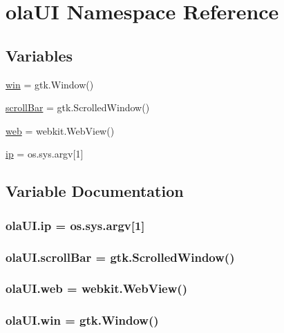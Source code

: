 \hypertarget{namespaceolaUI}{}\section{ola\+UI Namespace Reference}
\label{namespaceolaUI}
\subsection*{Variables}
\begin{DoxyCompactItemize}
\item 
\hyperlink{namespaceolaUI_a99a88a88414bc1bab55b329bd312ad76}{win} = gtk.\+Window()
\item 
\hyperlink{namespaceolaUI_a990ab1d4c8f6bdc16cffd8acb4f6be7b}{scroll\+Bar} = gtk.\+Scrolled\+Window()
\item 
\hyperlink{namespaceolaUI_a02fb6fdc4a5a894303b2c44d70971cc1}{web} = webkit.\+Web\+View()
\item 
\hyperlink{namespaceolaUI_a441ccce886b3119d7aec1d24ec8f25f7}{ip} = os.\+sys.\+argv\mbox{[}1\mbox{]}
\end{DoxyCompactItemize}


\subsection{Variable Documentation}
\subsubsection[{\texorpdfstring{ip}{ip}}]{\setlength{\rightskip}{0pt plus 5cm}ola\+U\+I.\+ip = os.\+sys.\+argv\mbox{[}1\mbox{]}}\hypertarget{namespaceolaUI_a441ccce886b3119d7aec1d24ec8f25f7}{}\label{namespaceolaUI_a441ccce886b3119d7aec1d24ec8f25f7}
\subsubsection[{\texorpdfstring{scroll\+Bar}{scrollBar}}]{\setlength{\rightskip}{0pt plus 5cm}ola\+U\+I.\+scroll\+Bar = gtk.\+Scrolled\+Window()}\hypertarget{namespaceolaUI_a990ab1d4c8f6bdc16cffd8acb4f6be7b}{}\label{namespaceolaUI_a990ab1d4c8f6bdc16cffd8acb4f6be7b}
\subsubsection[{\texorpdfstring{web}{web}}]{\setlength{\rightskip}{0pt plus 5cm}ola\+U\+I.\+web = webkit.\+Web\+View()}\hypertarget{namespaceolaUI_a02fb6fdc4a5a894303b2c44d70971cc1}{}\label{namespaceolaUI_a02fb6fdc4a5a894303b2c44d70971cc1}
\subsubsection[{\texorpdfstring{win}{win}}]{\setlength{\rightskip}{0pt plus 5cm}ola\+U\+I.\+win = gtk.\+Window()}\hypertarget{namespaceolaUI_a99a88a88414bc1bab55b329bd312ad76}{}\label{namespaceolaUI_a99a88a88414bc1bab55b329bd312ad76}

